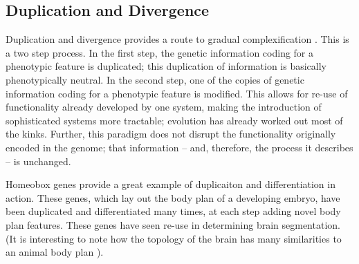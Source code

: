 \subsection{Duplication and Divergence} \label{sec:duplication_and_divergence}
Duplication and divergence provides a route to gradual complexification \cite[p 202]{Downing2015IntelligenceSystems}. This is a two step process. In the first step, the genetic information coding for a phenotypic feature is duplicated; this duplication of information is basically phenotypically neutral. In the second step, one of the copies of genetic information coding for a phenotypic feature is modified. This allows for re-use of functionality already developed by one system, making the introduction of sophisticated systems more tractable; evolution has already worked out most of the kinks. Further, this paradigm does not disrupt the functionality originally encoded in the genome; that information -- and, therefore, the process it describes -- is unchanged.

Homeobox genes provide a great example of duplicaiton and differentiation in action. These genes, which lay out the body plan of a developing embryo, have been duplicated and differentiated many times, at each step adding novel body plan features\cite[p 203]{Downing2015IntelligenceSystems}. These genes have seen re-use in determining brain segmentation. (It is interesting to note how the topology of the brain has many similarities to an animal body plan \cite[p 201]{Downing2015IntelligenceSystems}).
  
